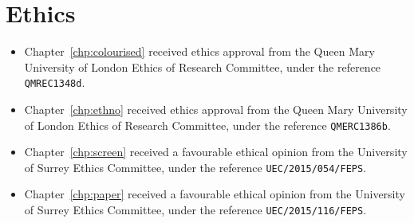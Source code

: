 \chapter*{Ethics}

\begin{itemize}
  \item Chapter~\ref{chp:colourised} received ethics approval from the Queen Mary University of
    London Ethics of Research Committee, under the reference \texttt{QMREC1348d}.
  \item Chapter~\ref{chp:ethno} received ethics approval from the Queen Mary University of
    London Ethics of Research Committee, under the reference \texttt{QMERC1386b}.
  \item Chapter~\ref{chp:screen} received a favourable ethical opinion from the University of Surrey Ethics
    Committee, under the reference \texttt{UEC/2015/054/FEPS}.
  \item Chapter~\ref{chp:paper} received a favourable ethical opinion from the University of Surrey Ethics
    Committee, under the reference \texttt{UEC/2015/116/FEPS}.
\end{itemize}
